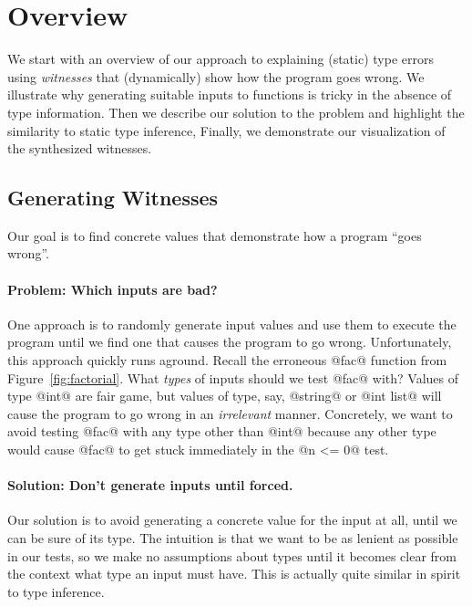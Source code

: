 \section{Overview}
\label{sec:overview}

We start with an overview of our approach to
explaining (static) type errors using \emph{witnesses}
that (dynamically) show how the program goes wrong.
%
We illustrate why generating suitable inputs
to functions is tricky in the absence of type
information.
%
Then we describe our solution to the problem
and highlight the similarity to static type
inference,
%
Finally, we demonstrate our visualization of
the synthesized witnesses.

\subsection{Generating Witnesses}
\label{sec:generating-witnesses}
Our goal is to find concrete values
that demonstrate how a program ``goes wrong''.

\paragraph{Problem: Which inputs are bad?}
%
One approach is to randomly generate input values and
use them to execute the program until we find one that
causes the program to go wrong.
%
Unfortunately, this approach quickly runs aground.
Recall the erroneous @fac@ function from Figure~\ref{fig:factorial}.
%
%
What \emph{types} of inputs should we test @fac@ with?
%
Values of type @int@ are fair game, but values of type, say,
@string@ or @int list@ will cause the program to go wrong
in an \emph{irrelevant} manner.
%
Concretely, we want to avoid testing @fac@ with any type other
than @int@ because any other type would cause @fac@ to get stuck
immediately in the @n <= 0@ test.

\paragraph{Solution: Don't generate inputs until forced.}
Our solution is to avoid generating a concrete value for the input at
all, until we can be sure of its type.
%
The intuition is that we want to be as lenient as possible in our tests,
so we make no assumptions about types until it becomes clear from the
context what type an input must have.
%
This is actually quite similar in spirit to type inference.

